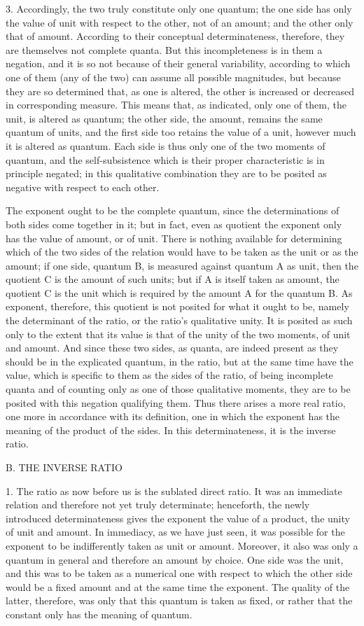 3. Accordingly, the two truly constitute only one quantum;
the one side has only the value of unit
with respect to the other, not of an amount;
and the other only that of amount.
According to their conceptual determinateness,
therefore, they are themselves not complete quanta.
But this incompleteness is in them a negation,
and it is so not because of their general variability,
according to which one of them (any of the two)
can assume all possible magnitudes,
but because they are so determined that, as one is altered,
the other is increased or decreased in corresponding measure.
This means that, as indicated, only one of them,
the unit, is altered as quantum;
the other side, the amount, remains the same quantum of units,
and the first side too retains the value of a unit,
however much it is altered as quantum.
Each side is thus only one of the two moments of quantum,
and the self-subsistence which is their proper characteristic
is in principle negated;
in this qualitative combination they are to be
 posited as negative with respect to each other.

The exponent ought to be the complete quantum,
since the determinations of both sides come together in it;
but in fact, even as quotient the
exponent only has the value of amount, or of unit.
There is nothing available for determining
which of the two sides of the relation would have to
be taken as the unit or as the amount;
if one side, quantum B,
is measured against quantum A as unit,
then the quotient C is the amount of such units;
but if A is itself taken as amount,
the quotient C is the unit which is required by
the amount A for the quantum B.
As exponent, therefore, this quotient is
not posited for what it ought to be,
namely the determinant of the ratio,
or the ratio's qualitative unity.
It is posited as such only to
the extent that its value is that
of the unity of the two moments,
of unit and amount.
And since these two sides, as quanta,
are indeed present as they should be
in the explicated quantum, in the ratio,
but at the same time have the value,
which is specific to them as the sides of the ratio,
of being incomplete quanta and of counting
only as one of those qualitative moments,
they are to be posited with this negation qualifying them.
Thus there arises a more real ratio,
one more in accordance with its definition,
one in which the exponent has the meaning of the product of the sides.
In this determinateness, it is the inverse ratio.

B. THE INVERSE RATIO

1. The ratio as now before us is the sublated direct ratio.
It was an immediate relation and therefore not yet truly determinate;
henceforth, the newly introduced determinateness gives
the exponent the value of a product,
the unity of unit and amount.
In immediacy, as we have just seen,
it was possible for the exponent to be
indifferently taken as unit or amount.
Moreover, it also was only a quantum in general
and therefore an amount by choice.
One side was the unit,
and this was to be taken as a numerical one
with respect to which the other side would be a fixed amount
and at the same time the exponent.
The quality of the latter, therefore,
was only that this quantum is taken as fixed,
or rather that the constant only
has the meaning of quantum.

